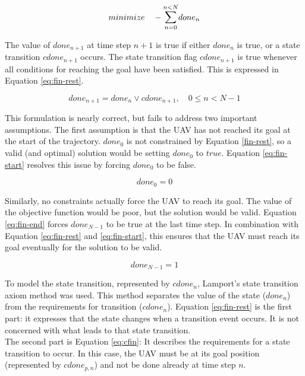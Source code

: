 \begin{equation}
\label{eq:goal-fun}
minimize \quad - \mathlarger{\sum}_{n=0}^{n < N} done_n
\end{equation}

The value of $done_{n+1}$ at time step $n + 1$ is true if either $done_n$ is true, or a state transition $cdone_{n+1}$ occurs. The state transition flag $cdone_{n+1}$ is true whenever all conditions for reaching the goal have been satisfied. This is expressed in Equation \ref{eq:fin-rest}.

\begin{equation}
\label{eq:fin-rest}
done_{n+1} = done_n \vee cdone_{n+1},  \quad 0 \leq n < N  - 1
\end{equation}

This formulation is nearly correct, but fails to address two important assumptions. The first assumption is that the UAV has not reached its goal at the start of the trajectory. $done_0$ is not constrained by Equation \ref{fin-rest}, so a valid (and optimal) solution would be setting $done_0$ to $true$. Equation \ref{eq:fin-start} resolves this issue by forcing $done_0$ to be false.

\begin{equation}
\label{eq:fin-start}
done_0 = 0
\end{equation}

Similarly, no constraints actually force the UAV to reach its goal. The value of the objective function would be poor, but the solution would be valid. Equation \ref{eq:fin-end} forces $done_{N-1}$ to be true at the last time step. In combination with Equation \ref{eq:fin-rest} and \ref{eq:fin-start}, this ensures that the UAV must reach its goal eventually for the solution to be valid.

\begin{equation}
\label{eq:fin-end}
done_{N - 1} = 1
\end{equation}

To model the state transition, represented by $cdone_{n}$, Lamport's \cite{Lamport1989} state transition axiom method was used. This method separates the value of the state ($done_{n}$) from the requirements for transition ($cdone_{n}$). Equation \ref{eq:fin-rest} is the first part: it expresses that the state changes when a transition event occurs. It is not concerned with what leads to that state transition. \\
The second part is Equation \ref{eq:cfin}: It describes the requirements for a state transition to occur. In this case, the UAV must be at its goal position (represented by $cdone_{p,n}$) and not be done already at time step $n$.

